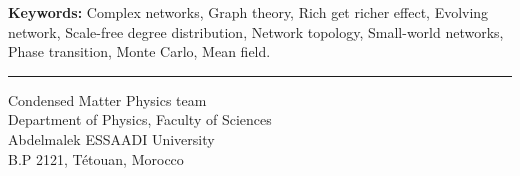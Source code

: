\documentclass[a4paper,12pt]{book}
\theoremstyle{break}
\begin{document}
{\large\textbf{Keywords:}}
{Complex networks, Graph theory, Rich get richer effect, Evolving network, Scale-free degree distribution, 
	Network topology, Small-world networks, Phase transition, Monte Carlo, Mean field.}\\
\noindent\rule[2pt]{\textwidth}{0.5pt}
\begin{center}
  Condensed Matter Physics team\\
Department of Physics, Faculty of Sciences\\
Abdelmalek ESSAADI University\\
B.P 2121, Tétouan, Morocco\\
  
\end{center}




\end{document}

